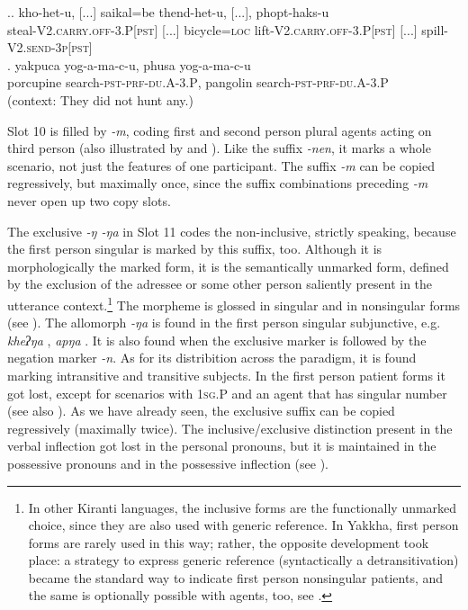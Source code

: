 \ex.\ag. kho-het-u, [...] saikal=be thend-het-u, [...],  phopt-haks-u      \\
steal{\scshape -V2.carry.off-3.P[pst]}  [...] bicycle{\scshape =loc} lift{\scshape -V2.carry.off-3.P[pst]} [...] spill{\scshape -V2.send-3p[pst]}\\
  
\bg. yakpuca   yog-a-ma-c-u, phusa    yog-a-ma-c-u\\
porcupine   search{\scshape -pst-prf-du.A-3.P}, pangolin   search{\scshape -pst-prf-du.A-3.P}\\
 (context: They did not hunt any.) 
	
	Slot  10 is filled by \emph{-m}, coding first and second person plural agents  acting on third person (also illustrated by \LLast[a] and \LLast[c]). Like the suffix \emph{-nen}, it marks a whole scenario, not just the features of one participant. The suffix \emph{-m} can be copied regressively, but maximally once, since the suffix combinations preceding \emph{-m} never open up two copy slots.
	
	
The  exclusive \emph{-ŋ \ti -ŋa} in Slot 11 codes the non-inclusive,  strictly speaking, because the first person singular is marked by this suffix, too. Although it is morphologically the  marked form,  it is the semantically unmarked form, defined by the exclusion of the adressee or some other person saliently present in the utterance context.\footnote{In other Kiranti languages, the inclusive forms are the functionally unmarked choice, since they are also used with generic reference. In Yakkha, first person forms are rarely used in this way; rather, the opposite development took place: a strategy to express generic reference (syntactically a detransitivation) became the standard way to indicate first person nonsingular patients, and the same is optionally possible with agents, too, see .} The morpheme is glossed  in singular and   in nonsingular forms (see \Next). The allomorph \emph{-ŋa} is found in the first person singular subjunctive, e.g. \emph{kheʔŋa} , \emph{apŋa} . It is also found when the exclusive marker is followed by the negation marker \emph{-n}. As for its distribition across the paradigm, it is found marking intransitive and transitive subjects. In the first person patient forms it got lost, except for scenarios with {\scshape 1sg.P}  and an agent that has singular number (see also ). As we have already seen, the exclusive suffix can be copied regressively (maximally twice). The inclusive/exclusive distinction present in the verbal inflection got lost in the personal pronouns, but it is maintained in the possessive pronouns and in the possessive inflection (see ). 

